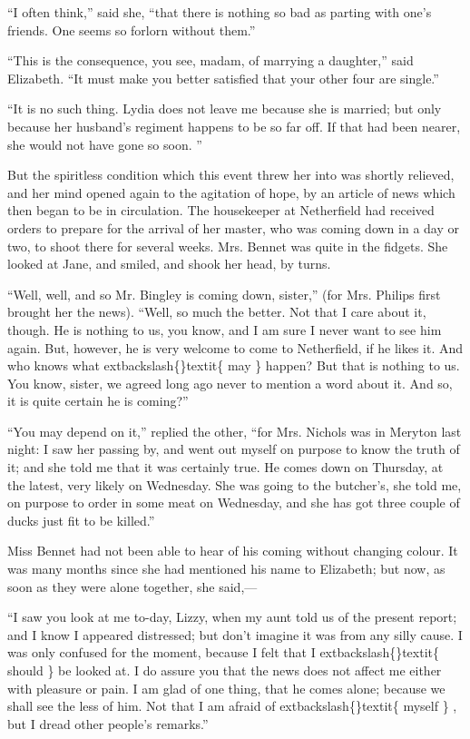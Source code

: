 \documentclass[10pt]{book}
\begin{document}
   “I often think,” said she, “that there is nothing so bad as parting with
one’s friends. One seems so forlorn without them.”
  

   “This is the consequence, you see, madam, of marrying a daughter,” said
Elizabeth. “It must make you better satisfied that your other four are
single.”
  

   “It is no such thing. Lydia does not leave me because she is married;
but only because her husband’s regiment happens to be so far off. If
that had been nearer, she would not have gone so soon.
   ”
  

   But the spiritless condition which this event threw her into was shortly
relieved, and her mind opened again to the agitation of hope, by an
article of news which then began to be in circulation. The housekeeper
at Netherfield had received orders to prepare for the arrival of her
master, who was coming down in a day or two, to shoot there for several
weeks. Mrs. Bennet was quite in the fidgets. She looked at Jane, and
smiled, and shook her head, by turns.
  

   “Well, well, and so Mr. Bingley is coming down, sister,” (for Mrs.
Philips first brought her the news). “Well, so much the better. Not that
I care about it, though. He is nothing to us, you know, and I am sure I
never want to see him again. But, however, he is very welcome to come to
Netherfield, if he likes it. And who knows what
   	extbackslash\{\}textit\{
    may
   \}
   happen? But that
is nothing to us. You know, sister, we agreed long ago never to mention
a word about it. And so, it is quite certain he is coming?”
  

   “You may depend on it,” replied the other, “for Mrs. Nichols was in
Meryton last night: I saw her passing by, and went out myself on purpose
to know the truth of it; and she told me that it was certainly true. He
comes down on Thursday, at the latest, very likely on Wednesday. She was
going to the butcher’s, she told me, on purpose to order in some meat on
Wednesday, and she has got three couple of ducks just fit to be killed.”
  

   Miss Bennet had not been able to hear of his coming without changing
colour. It was many months since she had mentioned his name to
Elizabeth; but now, as soon as they were alone together, she said,—
  

   “I saw you look at me to-day, Lizzy, when my aunt told us of the present
report; and I know I appeared
   distressed; but don’t imagine it was from
any silly cause. I was only confused for the moment, because I felt that
I
   	extbackslash\{\}textit\{
    should
   \}
   be looked at. I do assure you that the news does not affect
me either with pleasure or pain. I am glad of one thing, that he comes
alone; because we shall see the less of him. Not that I am afraid of
   	extbackslash\{\}textit\{
    myself
   \}
   , but I dread other people’s remarks.”
  
\end{document}
